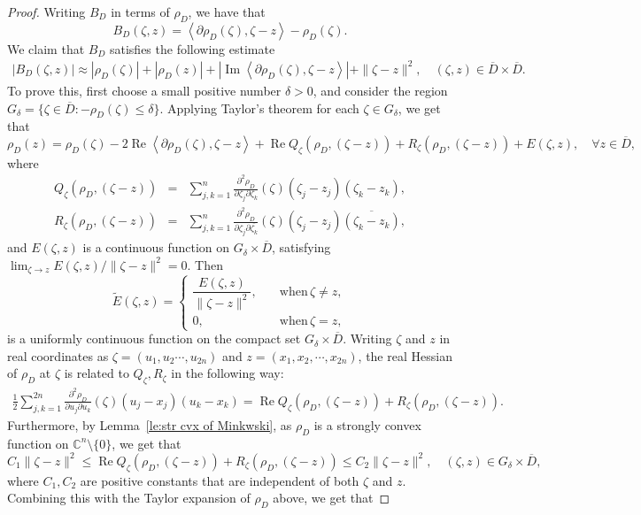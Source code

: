 \documentclass[11pt, oneside, reqno]{amsart}
\numberwithin{equation}{section}
\theoremstyle{definition}
\newcommand{\beas}{\begin{eqnarray*}}
\newcommand{\eeas}{\end{eqnarray*}}
\newcommand{\bea} {\begin{eqnarray}}
\newcommand{\eea} {\end{eqnarray}}
\newcommand{\C}{\mathbb C}
\newcommand{\Rea}{\operatorname{Re}}
\newcommand{\rea}{\operatorname{Re}}
\newcommand{\ltt}{\left(}
\newcommand{\rtt}{\right)}
\begin{document}
{\begin{proof}
Writing $B_D$ in terms of $\rho_D$, we have that
\[
B_D\ltt\zeta,z\rtt=\left\langle\partial \rho_D(\zeta),\zeta-z\right\rangle-\rho_D\ltt\zeta\rtt.
\]
We claim that $B_D$ satisfies the following estimate
\bea\label{eq:key est LS ker}
\left|B_D\ltt\zeta,z\rtt\right|\approx \left|\rho_D(\zeta)\right|+\left|\rho_D(z)\right|+\left|\operatorname{Im}\left\langle\partial \rho_D(\zeta),\zeta-z\right\rangle\right|+\|\zeta-z\|^2, \quad \ltt\zeta,z\rtt\in \overline{D}\times \overline{D}.
\eea
To prove this, first choose a small positive number $\delta>0$, and consider the region $G_{\delta}=\{\zeta\in\overline{D}: -\rho_D(\zeta)\leq\delta\}$.
Applying Taylor's theorem %
for each $\zeta\in G_\delta$, we get that 
\[
\rho_D(z)=\rho_D(\zeta)-2\Rea \left\langle\partial \rho_D(\zeta),\zeta-z\right\rangle+\rea Q_\zeta(\rho_D,(\zeta-z))+R_\zeta(\rho_D,(\zeta-z))+E(\zeta,z),\quad \forall z\in\overline{D},
\]
where
\beas
Q_\zeta(\rho_D,(\zeta-z))&=&\sum_{j,k=1}^{n}\frac{\partial^2 \rho_D}{\partial \zeta_j \partial \zeta_k}(\zeta) (\zeta_j-z_j)(\zeta_k-z_k),\\
R_\zeta(\rho_D,(\zeta-z))&=&\sum_{j,k=1}^{n}\frac{\partial^2 \rho_D}{\partial \zeta_j \partial \overline{\zeta_k}}(\zeta) (\zeta_j-z_j)\overline{(\zeta_k-z_k)},
\eeas
and $E(\zeta,z)$ is a continuous function on $G_\delta\times\overline D$, satisfying $\lim_{\zeta\rightarrow z}E(\zeta,z)/\|\zeta-z\|^2=0$.
Then 
\[
\widetilde{E}\ltt\zeta,z\rtt=\begin{cases}
\dfrac{E(\zeta,z)}{\|\zeta-z\|^2},&\quad \text{when}\,\zeta\neq z,\\
0,&\quad \text{when}\,\zeta=z,
\end{cases}
\]
is a uniformly continuous function on the compact set $G_\delta\times\overline D$.  
Writing $\zeta$ and $z$ in real coordinates as
$\zeta=(u_1,u_2\cdots,u_{2n})$ and $z=(x_1,x_2,\cdots,x_{2n})$, the real Hessian of $\rho_D$ at $\zeta$ is related to $Q_\zeta,R_\zeta$ in the following way:
\beas
\frac{1}{2}\sum_{j,k=1}^{2n}\frac{\partial^2 \rho_D}{\partial u_j \partial u_k}(\zeta) (u_j-x_j)(u_k-x_k)=\rea Q_\zeta(\rho_D,(\zeta-z))+R_\zeta(\rho_D,(\zeta-z)).
\eeas
Furthermore, by Lemma~\ref{le:str cvx of Minkwski}, as $\rho_D$ is a strongly convex function on $\C^n\setminus\{0\}$, we get that
\[
C_1\|\zeta-z\|^2\leq\rea Q_\zeta(\rho_D,(\zeta-z))+R_\zeta(\rho_D,(\zeta-z))\leq C_2\|\zeta-z\|^2,\quad 
(\zeta,z)\in G_\delta\times\overline D,
\]
where $C_1,C_2$ are positive constants that are independent of both $\zeta$ and $z$. 
Combining this with the Taylor expansion of $\rho_D$ above, we get that

\end{proof}}
\end{document}
